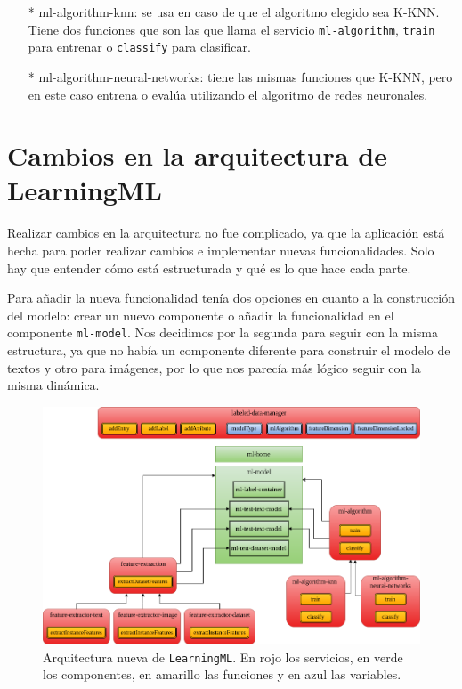 \documentclass[a4paper, 12pt]{book}
\begin{document}
\begin{itemize}
	\begin{itemize}
		\item[*] ml-algorithm-knn: se usa en caso de que el algoritmo elegido sea K-KNN. 
		Tiene dos funciones que son las que llama el servicio \texttt{ml-algorithm}, \texttt{train} para entrenar o \texttt{classify} para clasificar.
		\item[*] ml-algorithm-neural-networks: tiene las mismas funciones que K-KNN, pero en este caso entrena o evalúa utilizando el algoritmo de redes neuronales.
	\end{itemize}
\end{itemize}

\section{Cambios en la arquitectura de LearningML} 
\label{sec:arquitectura nueva}

Realizar cambios en la arquitectura no fue complicado, ya que la aplicación está hecha para poder realizar cambios e implementar nuevas funcionalidades. 
Solo hay que entender cómo está estructurada y qué es lo que hace cada parte.

Para añadir la nueva funcionalidad tenía dos opciones en cuanto a la construcción del modelo: crear un nuevo componente o añadir la funcionalidad en el componente \texttt{ml-model}. Nos decidimos por la segunda para seguir con la misma estructura, ya que no había un componente diferente para construir el modelo de textos y otro para imágenes, por lo que nos parecía más lógico seguir con la misma dinámica.

\begin{figure}[b!]
	\centering 
	\includegraphics[width=13cm, keepaspectratio]{img/arquitectura_nueva.png}
	\caption{Arquitectura nueva de \texttt{LearningML}. En rojo los servicios, en verde los componentes, en amarillo las funciones y en azul las variables.} \label{fig:arquitectura_nueva}
\end{figure}
\end{document}
